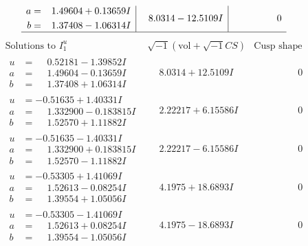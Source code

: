\documentclass[1p]{elsarticle_modified}
\theoremstyle{definition}
\newcommand{\I}{\sqrt{-1}}
\begin{document}
$$\begin{array}{c|c|c}
\begin{aligned}
a &= \phantom{-}1.49604 + 0.13659 I \\
b &= \phantom{-}1.37408 - 1.06314 I\end{aligned}
 & \phantom{-}8.0314 - 12.5109 I & \phantom{-0.000000 } 0\\
 \hline 
 \end{array}$$\newpage$$\begin{array}{c|c|c}  
\text{Solutions to }I^u_{1}& \I (\text{vol} + \sqrt{-1}CS) & \text{Cusp shape}\\
 \hline 
\begin{aligned}
u &= \phantom{-}0.52181 - 1.39852 I \\
a &= \phantom{-}1.49604 - 0.13659 I \\
b &= \phantom{-}1.37408 + 1.06314 I\end{aligned}
 & \phantom{-}8.0314 + 12.5109 I & \phantom{-0.000000 } 0 \\ \hline\begin{aligned}
u &= -0.51635 + 1.40331 I \\
a &= \phantom{-}1.332900 - 0.183815 I \\
b &= \phantom{-}1.52570 + 1.11882 I\end{aligned}
 & \phantom{-}2.22217 + 6.15586 I & \phantom{-0.000000 } 0 \\ \hline\begin{aligned}
u &= -0.51635 - 1.40331 I \\
a &= \phantom{-}1.332900 + 0.183815 I \\
b &= \phantom{-}1.52570 - 1.11882 I\end{aligned}
 & \phantom{-}2.22217 - 6.15586 I & \phantom{-0.000000 } 0 \\ \hline\begin{aligned}
u &= -0.53305 + 1.41069 I \\
a &= \phantom{-}1.52613 - 0.08254 I \\
b &= \phantom{-}1.39554 + 1.05056 I\end{aligned}
 & \phantom{-}4.1975 + 18.6893 I & \phantom{-0.000000 } 0 \\ \hline\begin{aligned}
u &= -0.53305 - 1.41069 I \\
a &= \phantom{-}1.52613 + 0.08254 I \\
b &= \phantom{-}1.39554 - 1.05056 I\end{aligned}
 & \phantom{-}4.1975 - 18.6893 I & \phantom{-0.000000 } 0 \\ \hline\begin{aligned}

\end{aligned}
\end{array}$$
\end{document}
